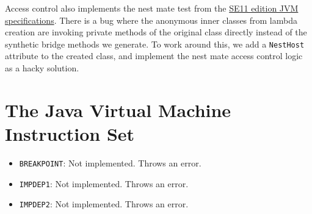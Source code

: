 Access control also implements the nest mate test from the \href{https://docs.oracle.com/javase/specs/jvms/se11/html/jvms-5.html#jvms-5.4.4}{SE11 edition JVM specifications}. 
There is a bug where the anonymous inner classes from lambda creation are invoking private methods of the original class directly instead of the synthetic bridge methods we generate.
To work around this, we add a \texttt{NestHost} attribute to the created class, and implement the nest mate access control logic as a hacky solution.

\section{The Java Virtual Machine Instruction Set}

\begin{itemize}
\item \texttt{BREAKPOINT}: Not implemented. Throws an error.
\item \texttt{IMPDEP1}: Not implemented. Throws an error.
\item \texttt{IMPDEP2}: Not implemented. Throws an error.
\end{itemize}


